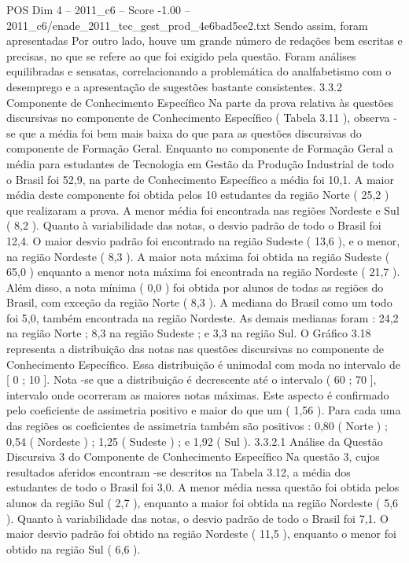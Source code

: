 \begin{textsample}{POS Dim 4 – 2011\_c6 – Score -1.00 – 2011\_c6/enade\_2011\_tec\_gest\_prod\_4e6bad5ee2.txt}
Sendo assim, foram apresentadas Por outro lado, houve um grande número de redações bem escritas e precisas, no que se refere ao que foi exigido pela questão.
Foram análises equilibradas e sensatas, correlacionando a problemática do analfabetismo com o desemprego e a apresentação de sugestões bastante consistentes. 3.3.2 Componente de Conhecimento Específico Na parte da prova relativa às questões discursivas no componente de Conhecimento Específico ( Tabela 3.11 ), observa -se que a média foi bem mais baixa do que para as questões discursivas do componente de Formação Geral.
Enquanto no componente de Formação Geral a média para estudantes de Tecnologia em Gestão da Produção Industrial de todo o Brasil foi 52,9, na parte de Conhecimento Específico a média foi 10,1.
A maior média deste componente foi obtida pelos 10 estudantes da região Norte ( 25,2 ) que realizaram a prova.
A menor média foi encontrada nas regiões Nordeste e Sul ( 8,2 ).
Quanto à variabilidade das notas, o desvio padrão de todo o Brasil foi 12,4.
O maior desvio padrão foi encontrado na região Sudeste ( 13,6 ), e o menor, na região Nordeste ( 8,3 ).
A maior nota máxima foi obtida na região Sudeste ( 65,0 ) enquanto a menor nota máxima foi encontrada na região Nordeste ( 21,7 ).
Além disso, a nota mínima ( 0,0 ) foi obtida por alunos de todas as regiões do Brasil, com exceção da região Norte ( 8,3 ).
A mediana do Brasil como um todo foi 5,0, também encontrada na região Nordeste.
As demais medianas foram : 24,2 na região Norte ; 8,3 na região Sudeste ; e 3,3 na região Sul.
O Gráfico 3.18 representa a distribuição das notas nas questões discursivas no componente de Conhecimento Específico.
Essa distribuição é unimodal com moda no intervalo de [ 0 ; 10 ].
Nota -se que a distribuição é decrescente até o intervalo ( 60 ; 70 ], intervalo onde ocorreram as maiores notas máximas.
Este aspecto é confirmado pelo coeficiente de assimetria positivo e maior do que um ( 1,56 ).
Para cada uma das regiões os coeficientes de assimetria também são positivos : 0,80 ( Norte ) ; 0,54 ( Nordeste ) ; 1,25 ( Sudeste ) ; e 1,92 ( Sul ). 3.3.2.1 Análise da Questão Discursiva 3 do Componente de Conhecimento Específico Na questão 3, cujos resultados aferidos encontram -se descritos na Tabela 3.12, a média dos estudantes de todo o Brasil foi 3,0.
A menor média nessa questão foi obtida pelos alunos da região Sul ( 2,7 ), enquanto a maior foi obtida na região Nordeste ( 5,6 ).
Quanto à variabilidade das notas, o desvio padrão de todo o Brasil foi 7,1.
O maior desvio padrão foi obtido na região Nordeste ( 11,5 ), enquanto o menor foi obtido na região Sul ( 6,6 ).

\end{textsample}
